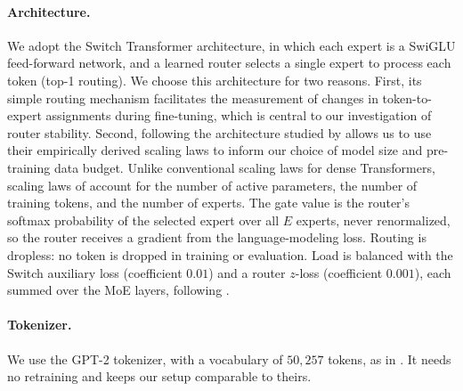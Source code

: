\documentclass[11pt,a4paper]{article}
\begin{document}
\paragraph{Architecture.}
We adopt the Switch Transformer architecture, in which each expert is a SwiGLU \cite{shazeer2020gluvariantsimprovetransformer} feed-forward network, and a learned router selects a single expert to process each token (top-1 routing). We choose this architecture for two reasons. First, its simple routing mechanism facilitates the measurement of changes in token-to-expert assignments during fine-tuning, which is central to our investigation of router stability. Second, following the architecture studied by \cite{ludziejewski2025jointmoescalinglaws} allows us to use their empirically derived scaling laws to inform our choice of model size and pre-training data budget. Unlike conventional scaling laws for dense Transformers, scaling laws of \cite{ludziejewski2025jointmoescalinglaws} account for the number of active parameters, the number of training tokens, and the number of experts.
The gate value is the router's softmax probability of the selected expert over all $E$ experts, never renormalized, so the router receives a gradient from the language-modeling loss. Routing is dropless: no token is dropped in training or evaluation. Load is balanced with the Switch auxiliary loss (coefficient $0.01$) and a router $z$-loss (coefficient $0.001$), each summed over the MoE layers, following \cite{ludziejewski2025jointmoescalinglaws}.

\paragraph{Tokenizer.} We use the GPT-2 tokenizer, with a vocabulary of $50{,}257$ tokens, as in \cite{ludziejewski2025jointmoescalinglaws}. It needs no retraining and keeps our setup comparable to theirs.
\end{document}
